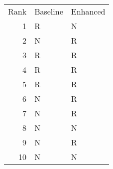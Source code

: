 \begin{tabular}{rll}
Rank & Baseline & Enhanced \\
1 & R & N \\
2 & N & R \\
3 & R & R \\
4 & R & R \\
5 & R & R \\
6 & N & R \\
7 & N & R \\
8 & N & N \\
9 & N & R \\
10 & N & N \\
\end{tabular}
